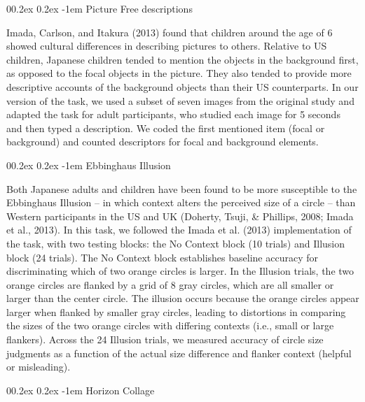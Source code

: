 \documentclass[
  man,floatsintext]{apa6}
\makeatletter
\let\oldparagraph\paragraph
\renewcommand{\paragraph}[1]{\oldparagraph{#1}\mbox{}}
\renewcommand{\paragraph}{\@startsection{paragraph}{4}{\parindent}%
  {0\baselineskip \@plus 0.2ex \@minus 0.2ex}%
  {-1em}%
  {\normalfont\normalsize\bfseries\itshape\typesectitle}}
\makeatother
\begin{document}
\hypertarget{picture-free-descriptions}{%
\paragraph{Picture Free descriptions}\label{picture-free-descriptions}}

Imada, Carlson, and Itakura (2013) found that children around the age of 6 showed cultural differences in describing pictures to others. Relative to US children, Japanese children tended to mention the objects in the background first, as opposed to the focal objects in the picture. They also tended to provide more descriptive accounts of the background objects than their US counterparts. In our version of the task, we used a subset of seven images from the original study and adapted the task for adult participants, who studied each image for 5 seconds and then typed a description. We coded the first mentioned item (focal or background) and counted descriptors for focal and background elements.

\hypertarget{ebbinghaus-illusion}{%
\paragraph{Ebbinghaus Illusion}\label{ebbinghaus-illusion}}

Both Japanese adults and children have been found to be more susceptible to the Ebbinghaus Illusion -- in which context alters the perceived size of a circle -- than Western participants in the US and UK (Doherty, Tsuji, \& Phillips, 2008; Imada et al., 2013). In this task, we followed the Imada et al. (2013) implementation of the task, with two testing blocks: the No Context block (10 trials) and Illusion block (24 trials). The No Context block establishes baseline accuracy for discriminating which of two orange circles is larger. In the Illusion trials, the two orange circles are flanked by a grid of 8 gray circles, which are all smaller or larger than the center circle. The illusion occurs because the orange circles appear larger when flanked by smaller gray circles, leading to distortions in comparing the sizes of the two orange circles with differing contexts (i.e., small or large flankers). Across the 24 Illusion trials, we measured accuracy of circle size judgments as a function of the actual size difference and flanker context (helpful or misleading).

\hypertarget{horizon-collage}{%
\paragraph{Horizon Collage}\label{horizon-collage}}
\end{document}
